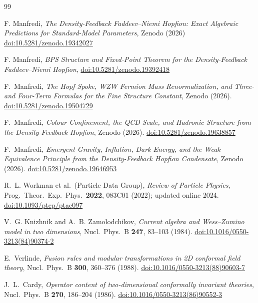 \documentclass[11pt,a4paper]{article}
\theoremstyle{definition}
\theoremstyle{remark}
\begin{document}
\begin{thebibliography}{99}

F. Manfredi,
\textit{The Density-Feedback Faddeev--Niemi Hopfion:
  Exact Algebraic Predictions for Standard-Model Parameters},
  Zenodo (2026)
\href{https://doi.org/10.5281/zenodo.19342027}{doi:10.5281/zenodo.19342027}

F. Manfredi,
\textit{BPS Structure and Fixed-Point Theorem for the
  Density-Feedback Faddeev--Niemi Hopfion},
\href{https://doi.org/10.5281/zenodo.19392418}{doi:10.5281/zenodo.19392418}

F.~Manfredi,
\textit{The Hopf Spoke, WZW Fermion Mass Renormalization,
  and Three- and Four-Term Formulas for the Fine Structure Constant},
Zenodo (2026).
\href{https://doi.org/10.5281/zenodo.19504729}{doi:10.5281/zenodo.19504729}

F.~Manfredi,
\textit{Colour Confinement, the QCD Scale, and Hadronic Structure
  from the Density-Feedback Hopfion},
Zenodo (2026).
\href{https://doi.org/10.5281/zenodo.19638857}{doi:10.5281/zenodo.19638857}

F.~Manfredi,
\textit{Emergent Gravity, Inflation, Dark Energy, and the Weak
  Equivalence Principle from the Density-Feedback Hopfion Condensate},
Zenodo (2026).
\href{https://doi.org/10.5281/zenodo.19646953}{doi:10.5281/zenodo.19646953}

R.~L. Workman et al.\ (Particle Data Group),
\textit{Review of Particle Physics},
Prog.\ Theor.\ Exp.\ Phys.\ \textbf{2022}, 083C01 (2022);
updated online 2024.
\href{https://doi.org/10.1093/ptep/ptac097}{doi:10.1093/ptep/ptac097}

V.~G. Knizhnik and A.~B. Zamolodchikov,
\textit{Current algebra and Wess--Zumino model in two dimensions},
Nucl.\ Phys.\ B \textbf{247}, 83--103 (1984).
\href{https://doi.org/10.1016/0550-3213(84)90374-2}{doi:10.1016/0550-3213(84)90374-2}

E.~Verlinde,
\textit{Fusion rules and modular transformations in 2D conformal
  field theory},
Nucl.\ Phys.\ B \textbf{300}, 360--376 (1988).
\href{https://doi.org/10.1016/0550-3213(88)90603-7}{doi:10.1016/0550-3213(88)90603-7}

J.~L.~Cardy,
\textit{Operator content of two-dimensional conformally invariant theories},
Nucl.\ Phys.\ B \textbf{270}, 186--204 (1986).
\href{https://doi.org/10.1016/0550-3213(86)90552-3}{doi:10.1016/0550-3213(86)90552-3}


\end{thebibliography}
\end{document}
